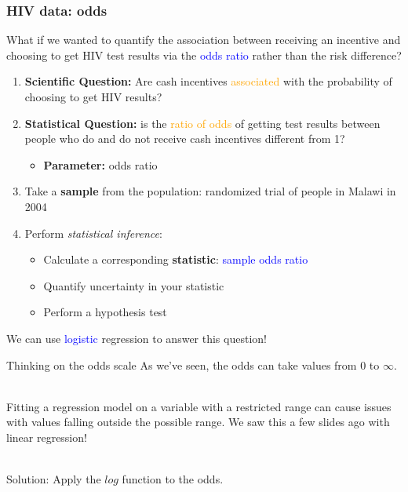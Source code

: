 \documentclass[10pt,t]{beamer}
\begin{document}
\begin{frame}
	\frametitle{HIV data: odds}
	\vspace{-0.5cm}
	\begin{small} What if we wanted to quantify the association between receiving an incentive and choosing to get HIV test results via the \textcolor{blue}{odds ratio} rather than the risk difference? \end{small}   \vspace{0.1cm}

	\begin{enumerate}
			\item \textbf{Scientific Question:} Are cash incentives \textcolor{orange}{associated} with the probability of choosing to get HIV results?  
			\item \textbf{Statistical Question:} is the \textcolor{orange}{ratio of odds} of getting test results between people who do and do not receive cash incentives different from 1?  
			\begin{itemize}
					\item \textbf{Parameter:} odds ratio  
				\end{itemize}
			\item Take a \textbf{sample} from the population: randomized trial of people in Malawi in 2004 
			\item Perform \textit{statistical inference}:
			\begin{itemize}
					\item Calculate a corresponding \textbf{statistic}: \textcolor{blue}{sample odds ratio}
					\item Quantify uncertainty in your statistic
					\item Perform a hypothesis test  
				\end{itemize}
		\end{enumerate}
	
	\vspace{0.1cm}
	We can use \textcolor{blue}{logistic} regression to answer this question!
\end{frame}

\begin{frame}{Thinking on the odds scale}
	As we've seen, the odds can take values from 0 to $\infty$. 
	\\ ~\
	
	Fitting a regression model on a variable with a restricted range can cause issues with values falling outside the possible range. We saw this a few slides ago with linear regression!
	\\ ~\
	
	Solution: Apply the $log$ function to the odds. 
\end{frame}
\end{document}

